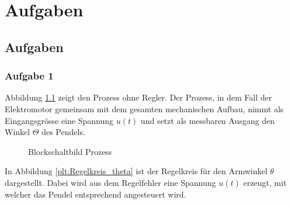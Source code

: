 \chapter{Aufgaben}\label{chap:Aufgaben}
\section{Aufgaben}\label{sec:sec1}
	\subsection{Aufgabe 1}\label{sub:A1}
	
	Abbildung \ref{plt:Prozess_P} zeigt den Prozess ohne Regler. Der Prozess, in dem Fall der Elektromotor gemeinsam mit dem gesamten mechanischen Aufbau, nimmt als Eingangsgrösse eine Spannung $u(t)$ und setzt als messbaren Ausgang den Winkel $\Theta$ des Pendels. 
	
	
\begin{figure}[h]
	\centering
\caption{Blockschaltbild Prozess}
\label{plt:Prozess_P}
\end{figure}


In Abbildung \ref{plt:Regelkreis_theta} ist der Regelkreis für den Armwinkel $\theta$ dargestellt. Dabei wird aus dem Regelfehler eine Spannung $u(t)$ erzeugt, mit welcher das Pendel entsprechend angesteuert wird. 




